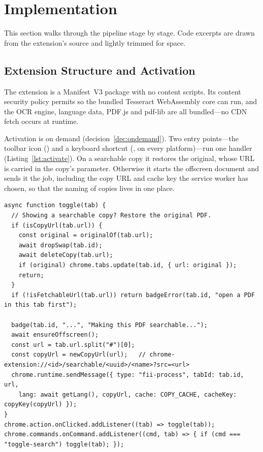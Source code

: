 \section{Implementation}
\label{sec:impl}

This section walks through the pipeline stage by stage. Code excerpts are drawn
from the extension's source and lightly trimmed for space.

\subsection{Extension Structure and Activation}
The extension is a Manifest~V3 package with no content scripts. Its content
security policy permits  so the bundled Tesseract
WebAssembly core can run, and the OCR engine, language data, PDF.js and pdf-lib
are all bundled---no CDN fetch occurs at runtime.

Activation is on demand (decision~\ref{dec:ondemand}). Two entry points---the
toolbar icon () and a keyboard shortcut
(,  on every platform)---run one
handler (Listing~\ref{lst:activate}). On a searchable copy it restores the
original, whose URL is carried in the copy's  parameter. Otherwise it
starts the offscreen document and sends it the job, including the copy URL and
cache key the service worker has chosen, so that the naming of copies lives in
one place.

\begin{lstlisting}[caption={On-demand activation: one handler for the toolbar icon and the shortcut. It restores the original when the tab shows a copy, and otherwise starts a job (\code{service-worker.js}).}, label={lst:activate}]
async function toggle(tab) {
  // Showing a searchable copy? Restore the original PDF.
  if (isCopyUrl(tab.url)) {
    const original = originalOf(tab.url);
    await dropSwap(tab.id);
    await deleteCopy(tab.url);
    if (original) chrome.tabs.update(tab.id, { url: original });
    return;
  }
  if (!isFetchableUrl(tab.url)) return badgeError(tab.id, "open a PDF in this tab first");

  badge(tab.id, "...", "Making this PDF searchable...");
  await ensureOffscreen();
  const url = tab.url.split("#")[0];
  const copyUrl = newCopyUrl(url);   // chrome-extension://<id>/searchable/<uuid>/<name>?src=<url>
  chrome.runtime.sendMessage({ type: "fii-process", tabId: tab.id, url,
    lang: await getLang(), copyUrl, cache: COPY_CACHE, cacheKey: copyKey(copyUrl) });
}
chrome.action.onClicked.addListener((tab) => toggle(tab));
chrome.commands.onCommand.addListener((cmd, tab) => { if (cmd === "toggle-search") toggle(tab); });
\end{lstlisting}

